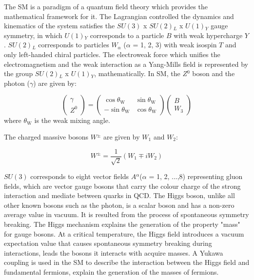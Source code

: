 \documentclass[UTF8,12pt]{ctexart}
\numberwithin{equation}{section}
\def\ga{\gamma}
\begin{document}
The SM is a paradigm of a quantum field theory which provides the mathematical framework for it. The Lagrangian controlled the dynamics and kinematics of the system satisfies the $SU(3)$ x $SU(2)$$_L$ x $U(1)$$_Y$ gauge symmetry, in which $U(1)$$_Y$ corresponds to a particle $B$ with weak hypercharge $Y$. $SU(2)$$_L$ corresponds to particles $W$$_\alpha$ ($\alpha$ = 1, 2, 3) with weak isospin $T$ and only left-handed chiral particles. The electroweak force which unifies the electromagnetism and the weak interaction as a Yang-Mills field is represented by the group $SU(2)$$_L$ x $U(1)$$_Y$, mathematically. In SM, the $Z$$^0$ boson and the photon ($\ga$) are given by: 

\begin{equation}
\left(\begin{array}{c}\gamma \\ Z^{0}\end{array}\right)=\left(\begin{array}{cc}\cos \theta_{\mathrm{W}} & \sin \theta_{\mathrm{W}} \\ -\sin \theta_{\mathrm{W}} & \cos \theta_{\mathrm{W}}\end{array}\right)\left(\begin{array}{c}B \\ W_{3}\end{array}\right)
\end{equation}
where $\theta_{\mathrm{W}}$ is the weak mixing angle. 

The charged massive bosons $W$$^\pm$ are given by $W$$_1$ and $W$$_2$:


\begin{equation}
W^{\pm}=\frac{1}{\sqrt{2}}\left(W_{1} \mp i W_{2}\right)
 \end{equation}

$SU(3)$ corresponds to eight vector fields $A$$^\alpha$($\alpha$ = 1, 2, ...,8) representing gluon fields, which are vector gauge bosons that carry the colour charge of the strong interaction and mediate between quarks in QCD.
The Higgs boson, unlike all other known bosons such as the photon, is a scalar boson and has a non-zero average value in vacuum. It is resulted from the process of spontaneous symmetry breaking. The Higgs mechanism explains the generation of the property "mass" for gauge bosons. At a critical temperature, the Higgs field introduces a vacuum expectation value that causes spontaneous symmetry breaking during interactions, leads the bosons it interacts with acquire masses. A Yukawa coupling is used in the SM to describe the interaction between the Higgs field and fundamental fermions, explain the generation of the masses of fermions. 
\end{document}
